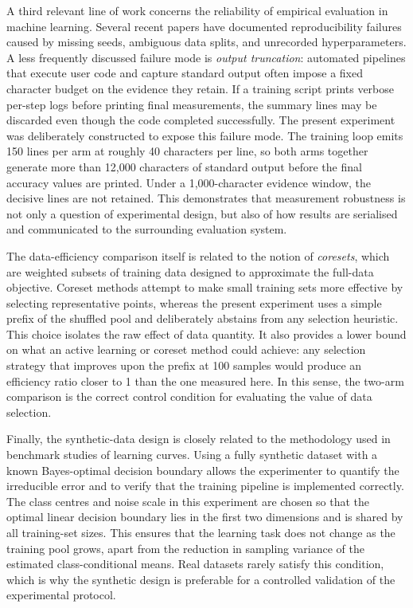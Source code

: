\documentclass{article}
\begin{document}
A third relevant line of work concerns the reliability of empirical evaluation in machine learning. Several recent papers have documented reproducibility failures caused by missing seeds, ambiguous data splits, and unrecorded hyperparameters. A less frequently discussed failure mode is \emph{output truncation}: automated pipelines that execute user code and capture standard output often impose a fixed character budget on the evidence they retain. If a training script prints verbose per-step logs before printing final measurements, the summary lines may be discarded even though the code completed successfully. The present experiment was deliberately constructed to expose this failure mode. The training loop emits 150 lines per arm at roughly 40 characters per line, so both arms together generate more than 12{,}000 characters of standard output before the final accuracy values are printed. Under a 1{,}000-character evidence window, the decisive lines are not retained. This demonstrates that measurement robustness is not only a question of experimental design, but also of how results are serialised and communicated to the surrounding evaluation system.

The data-efficiency comparison itself is related to the notion of \emph{coresets}, which are weighted subsets of training data designed to approximate the full-data objective. Coreset methods attempt to make small training sets more effective by selecting representative points, whereas the present experiment uses a simple prefix of the shuffled pool and deliberately abstains from any selection heuristic. This choice isolates the raw effect of data quantity. It also provides a lower bound on what an active learning or coreset method could achieve: any selection strategy that improves upon the prefix at 100 samples would produce an efficiency ratio closer to 1 than the one measured here. In this sense, the two-arm comparison is the correct control condition for evaluating the value of data selection.

Finally, the synthetic-data design is closely related to the methodology used in benchmark studies of learning curves. Using a fully synthetic dataset with a known Bayes-optimal decision boundary allows the experimenter to quantify the irreducible error and to verify that the training pipeline is implemented correctly. The class centres and noise scale in this experiment are chosen so that the optimal linear decision boundary lies in the first two dimensions and is shared by all training-set sizes. This ensures that the learning task does not change as the training pool grows, apart from the reduction in sampling variance of the estimated class-conditional means. Real datasets rarely satisfy this condition, which is why the synthetic design is preferable for a controlled validation of the experimental protocol.
\end{document}
